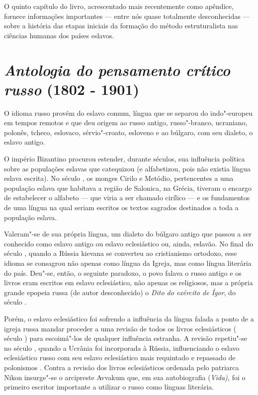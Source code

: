 O quinto capítulo do livro, acrescentado mais recentemente como
apêndice, fornece informações importantes --- entre nós quase totalmente
desconhecidas --- sobre a história das etapas iniciais da formação do
método estruturalista nas ciências humanas dos países eslavos.

\chapter{\emph{Antologia do pensamento crítico russo} (1802 - 1901) }

O idioma russo provém do eslavo comum, língua que se separou do
indo"-europeu em tempos remotos e que deu origem ao russo antigo,
russo"-branco, ucraniano, polonês, tcheco, eslovaco, sérvio"-croato,
esloveno e ao búlgaro, com seu dialeto, o eslavo antigo.

O império Bizantino procurou estender, durante séculos, sua influência
política sobre as populações eslavas que catequizou (e alfabetizou, pois
não existia língua eslava escrita). No século , os monges Cirilo e
Metódio, pertencentes a uma população eslava que habitava a região de
Salonica, na Grécia, tiveram o encargo de estabelecer o alfabeto --- que
viria a ser chamado cirílico --- e os fundamentos de uma língua na qual
seriam escritos os textos sagrados destinados a toda a população eslava.

Valeram"-se de sua própria língua, um dialeto do búlgaro antigo que
passou a ser conhecido como eslavo antigo ou eslavo eclesiástico ou,
ainda, eslavão. No final do século , quando a Rússia kievana se
converteu ao cristianismo ortodoxo, esse idioma se consagrou não apenas
como língua da Igreja, mas como língua literária do país. Deu"-se, então,
o seguinte paradoxo, o povo falava o russo antigo e os livros eram
escritos em eslavo eclesiástico, não apenas os religiosos, mas a própria
grande epopeia russa (de autor desconhecido) o \emph{Dito do exército de
Ígor}, do século .

Porém, o eslavo eclesiástico foi sofrendo a influência da língua falada
a ponto de a igreja russa mandar proceder a uma revisão de todos os
livros eclesiásticos ( século ) para escoimá"-los de qualquer
influência estranha. A revisão repetiu"-se no século , quando a
Ucrânia foi incorporada à Rússia, influenciando o eslavo eclesiástico
russo com seu eslavo eclesiástico mais requintado e repassado de
polonismos . Contra a revisão dos livros eclesiásticos ordenada pelo
patriarca Nikon insurge"-se o arcipreste Avvakum que, em sua
autobiografia (\emph{Vida),} foi o primeiro escritor importante a
utilizar o russo como línguas literária.

